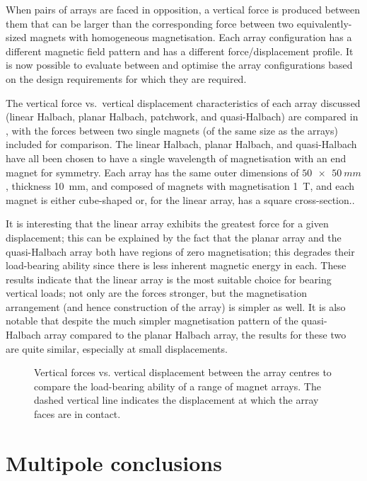 \documentclass[11pt,a4paper]{memoir}
\begin{document}
When pairs of arrays are faced in opposition, a vertical force is produced between them that can be larger than the corresponding force between two equivalently-sized magnets with homogeneous magnetisation.
Each array configuration has a different magnetic field pattern and has a different force/displacement profile.
It is now possible to evaluate between and optimise the array configurations based on the design requirements for which they are required.

The vertical force vs.\ vertical displacement characteristics of each array discussed (linear Halbach, planar Halbach, patchwork, and quasi-Halbach) are compared in , with the forces between two single magnets (of the same size as the arrays) included for comparison.
The linear Halbach, planar Halbach, and quasi-Halbach have all been chosen to have a single wavelength of magnetisation with an end magnet for symmetry.
Each array has the same outer dimensions of $\SI{50x50}{mm}$, thickness \SI{10}{mm}, and composed of magnets with magnetisation \SI{1}{T}, and each magnet is either cube-shaped or, for the linear array, has a square cross-section..

It is interesting that the linear array exhibits the greatest force for a given displacement; this can be explained by the fact that the planar array and the quasi-Halbach array both have regions of zero magnetisation; this degrades their load-bearing ability since there is less inherent magnetic energy in each.
These results indicate that the linear array is the most suitable choice for bearing vertical loads; not only are the forces stronger, but the magnetisation arrangement (and hence construction of the array) is simpler as well.
It is also notable that despite the much simpler magnetisation pattern of the quasi-Halbach array compared to the planar Halbach array, the results for these two are quite similar, especially at small displacements.

\begin{figure}
\centering
{}
\caption{Vertical forces vs. vertical displacement between the array centres to compare the load-bearing ability of a range of magnet arrays. The dashed vertical line indicates the displacement at which the array faces are in contact.}
\end{figure}

\section{Multipole conclusions}
\end{document}
